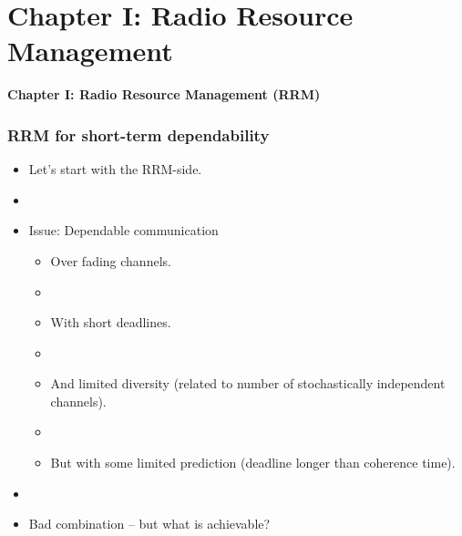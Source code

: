 \documentclass{beamer}
\begin{document}
\section{Chapter I: Radio Resource Management}
\begin{frame}
\centerline{\textbf{Chapter I: Radio Resource Management (RRM)}}

\end{frame}
\begin{frame}
  \frametitle{RRM for short-term dependability}
  \begin{itemize}
  
  \item Let's start with the RRM-side.
  \item[]
  \item Issue:  Dependable communication 
    \begin{itemize}
    \item Over fading channels.
    \item[]
    \item With short deadlines.
    \item[]
    \item And limited  diversity (related to number of stochastically independent channels).
    \item[]
    \item But with some limited prediction (deadline longer than
      coherence time).
    \end{itemize}
 \item[]
 \item Bad combination -- but what is achievable? 
  \end{itemize}
\end{frame}
\end{document}
